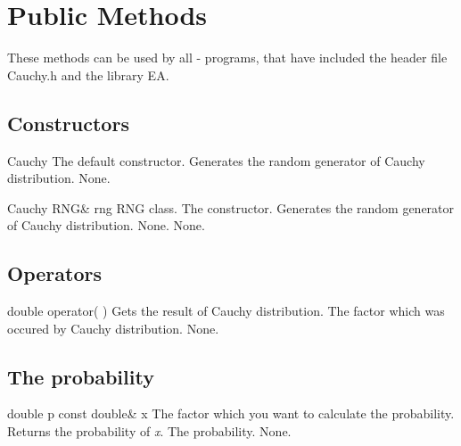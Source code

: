 \clearpage

\section{Public Methods}

\noindent
These methods can be used by all \cpp - programs, that have included the
header file Cauchy.h and the library EA.

\subsection{Constructors}

\setNormalInstance
\printEmptyMethodReturn
{}
{Cauchy}
{The default constructor. Generates the random generator of Cauchy distribution.}
{None.}

\setNormalInstance
\printMethodWithOneParam
{}
{Cauchy}
{RNG\&}
{rng}
{RNG class.}
{The constructor. Generates the random generator of Cauchy distribution.}
{None.}
{None.}

\vspace*{10mm}

\subsection{Operators}

\setNormalInstance
\printEmptyMethodReturnSpecial
{double}
{operator( )}
{Gets the result of Cauchy distribution.}
{The factor which was occured by Cauchy distribution.}
{None.}

\clearpage

\subsection{The probability}

\setConstInstance
\printMethodWithOneParam
{double}
{p}
{const double\&}
{x}
{The factor which you want to calculate the probability.}
{Returns the probability of {\em x}.}
{The probability.}
{None.}






